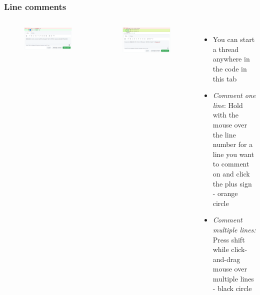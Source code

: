 \documentclass[aspectratio=169]{beamer} %
\begin{document}
\begin{frame}
	\frametitle{Line comments}
	\begin{columns}[c]
		
		\vspace{-.4cm}
		\begin{figure}
			\centering
			\includegraphics[width=.9\textwidth]{./img/line-comment-1.png}
		\end{figure}
		\vspace{-.3cm}
		\begin{figure}
			\centering
			\includegraphics[width=.9\textwidth]{./img/line-comment-2.png}
		\end{figure}
		
		\begin{itemize}
			\setlength\itemsep{1em}
			\item You can start a thread anywhere in the code in this tab
			\item \textit{Comment one line}: Hold with the mouse over the line number 
			for a line you want to comment on and click the plus sign - orange circle
			\item \textit{Comment multiple lines:} Press shift while 
			click-and-drag mouse over multiple lines - black circle
		\end{itemize}
		
	\end{columns}
\end{frame}
\end{document}
